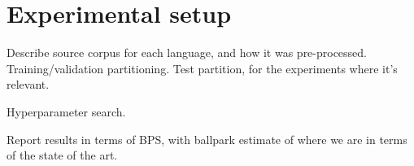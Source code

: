 \section{Experimental setup}
\label{sec:setup}

Describe source corpus for each language, and how it was
pre-processed. Training/validation partitioning. Test partition, for
the experiments where it's relevant.

Hyperparameter search.

Report results in terms of BPS, with ballpark estimate of where we are
in terms of the state of the art.

